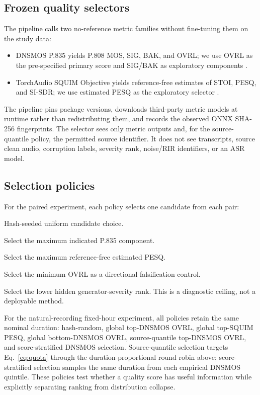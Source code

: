 \documentclass[10pt,twocolumn]{article}
\newcommand{\dns}{\textsc{DNSMOS}}
\newcommand{\squim}{\textsc{SQUIM}}
\newcommand{\asr}{\textsc{ASR}}
\begin{document}
\subsection{Frozen quality selectors}

The pipeline calls two no-reference metric families without fine-tuning them on the study data:

\begin{itemize}[leftmargin=1.2em,itemsep=0.1em]
    \item \dns{} P.835 yields P.808 MOS, SIG, BAK, and OVRL; we use OVRL as the pre-specified primary score and SIG/BAK as exploratory components \citep{reddy2022dnsmosp835}.
    \item TorchAudio \squim{} Objective yields reference-free estimates of STOI, PESQ, and SI-SDR; we use estimated PESQ as the exploratory selector \citep{kumar2023squim}.
\end{itemize}

The pipeline pins package versions, downloads third-party metric models at runtime rather than redistributing them, and records the observed ONNX SHA-256 fingerprints. The selector sees only metric outputs and, for the source-quantile policy, the permitted source identifier. It does not see transcripts, source clean audio, corruption labels, severity rank, noise/RIR identifiers, or an \asr{} model.

\subsection{Selection policies}

For the paired experiment, each policy selects one candidate from each pair:
\begin{description}[leftmargin=1.8em,itemsep=0.1em]
    \item[Random] Hash-seeded uniform candidate choice.
    \item[\dns{} OVRL, SIG, BAK] Select the maximum indicated P.835 component.
    \item[\squim{} PESQ] Select the maximum reference-free estimated PESQ.
    \item[Low \dns{} OVRL] Select the minimum OVRL as a directional falsification control.
    \item[Oracle severity] Select the lower hidden generator-severity rank. This is a diagnostic ceiling, not a deployable method.
\end{description}

For the natural-recording fixed-hour experiment, all policies retain the same nominal duration: hash-random, global top-\dns{} OVRL, global top-\squim{} PESQ, global bottom-\dns{} OVRL, source-quantile top-\dns{} OVRL, and score-stratified \dns{} selection. Source-quantile selection targets Eq.~\ref{eq:quota} through the duration-proportional round robin above; score-stratified selection samples the same duration from each empirical \dns{} quintile. These policies test whether a quality score has useful information while explicitly separating ranking from distribution collapse.
\end{document}
